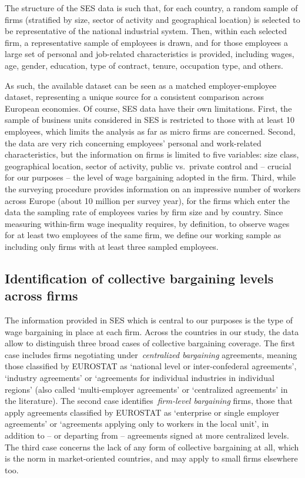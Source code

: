 \documentclass[12pt]{article}
\begin{document}
The structure of the SES data is such that, for each country, a random sample of firms (stratified by size, sector of activity and geographical location) is selected to be representative of the national industrial system. Then, within each selected firm, a representative sample of employees is drawn, and for those employees a large set of personal and job-related characteristics is provided, including wages, age, gender, education, type of contract, tenure, occupation type, and others. 

As such, the available dataset can be seen as a matched employer-employee dataset, representing a unique source for a consistent comparison across European economies.  Of course, SES data have their own limitations. First, the sample of business units considered in SES is restricted to those with at least 10 employees, which limits the analysis as far as micro firms are concerned. Second, the data are very rich concerning employees' personal and work-related characteristics, but the information on firms is limited to five variables: size class, geographical location, sector of activity, public vs.\ private control and -- crucial for our purposes -- the level of wage bargaining adopted in the firm. Third, while the surveying procedure provides information on an impressive number of workers across Europe (about 10 million per survey year), for the firms which enter the data the sampling rate of employees varies by firm size and by country. Since measuring within-firm wage inequality requires, by definition, to observe wages for at least two employees of the same firm, we define our working sample as including only firms with at least three sampled employees.

\subsection*{Identification of collective bargaining levels across firms}
\label{sec:decentralisation}
The information provided in SES which is central to our purposes is the type of wage bargaining in place at each firm. Across the countries in our study, the data allow to distinguish three broad cases of collective bargaining coverage. The first case includes firms negotiating under~\emph{centralized bargaining} agreements, meaning those classified by EUROSTAT as ‘national level or inter-confederal agreements’, ‘industry agreements’ or ‘agreements for individual industries in individual regions’ (also called ‘multi-employer agreements’ or ‘centralized agreements’ in the literature). The second case identifies~\emph{firm-level bargaining} firms, those that apply agreements classified by EUROSTAT as ‘enterprise or single employer agreements’ or ‘agreements applying only to workers in the local unit’, in addition to -- or departing from -- agreements signed at more centralized levels. The third case concerns the lack of any form of collective bargaining at all, which is the norm in market-oriented countries, and may apply to small firms elsewhere too.
\end{document}
